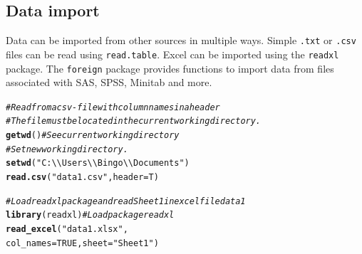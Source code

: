 \documentclass{article}\usepackage[]{graphicx}\usepackage[]{color}
\makeatletter
\newcommand{\hlnum}[1]{\textcolor[rgb]{0.686,0.059,0.569}{#1}}%
\newcommand{\hlstr}[1]{\textcolor[rgb]{0.192,0.494,0.8}{#1}}%
\newcommand{\hlcom}[1]{\textcolor[rgb]{0.678,0.584,0.686}{\textit{#1}}}%
\newcommand{\hlstd}[1]{\textcolor[rgb]{0.345,0.345,0.345}{#1}}%
\newcommand{\hlkwc}[1]{\textcolor[rgb]{0.333,0.667,0.333}{#1}}%
\newcommand{\hlkwd}[1]{\textcolor[rgb]{0.737,0.353,0.396}{\textbf{#1}}}%
\newenvironment{kframe}{%
 \def\at@end@of@kframe{}%
 \ifinner\ifhmode%
  \def\at@end@of@kframe{\end{minipage}}%
  \begin{minipage}{\columnwidth}%
 \fi\fi%
 \def\FrameCommand##1{\hskip\@totalleftmargin \hskip-\fboxsep
 \colorbox{shadecolor}{##1}\hskip-\fboxsep
     \hskip-\linewidth \hskip-\@totalleftmargin \hskip\columnwidth}%
 \MakeFramed {\advance\hsize-\width
   \@totalleftmargin\z@ \linewidth\hsize
   \@setminipage}}%
 {\par\unskip\endMakeFramed%
 \at@end@of@kframe}
\newenvironment{knitrout}{}{} %
\makeatother
\begin{document}
\subsection{Data import}
Data can be imported from other sources in multiple ways. Simple \texttt{.txt} or \texttt{.csv} files can be read using \texttt{read.table}. 
Excel can be imported using the \texttt{readxl} package.
The \texttt{foreign} package provides functions to import data from files associated with SAS, SPSS, Minitab and more.

\begin{knitrout}
\color{fgcolor}\begin{kframe}
\begin{alltt}
\hlcom{#Read from a csv-file with column names in a header}
\hlcom{#The file must be located in the current working directory.}
\hlkwd{getwd}\hlstd{()} \hlcom{#See current working directory}
\hlcom{#Set new working directory.}
\hlkwd{setwd}\hlstd{(}\hlstr{"C:\textbackslash{}\textbackslash{}Users\textbackslash{}\textbackslash{}Bingo\textbackslash{}\textbackslash{}Documents"}\hlstd{)}
\hlkwd{read.csv}\hlstd{(}\hlstr{"data1.csv"}\hlstd{,} \hlkwc{header} \hlstd{= T)}

\hlcom{#Load readxl package and read Sheet 1 in excel file data1}
\hlkwd{library}\hlstd{(readxl)} \hlcom{#Load package readxl}
\hlkwd{read_excel}\hlstd{(}\hlstr{"data1.xlsx"}\hlstd{,}
           \hlkwc{col_names}\hlstd{=} \hlnum{TRUE}\hlstd{,} \hlkwc{sheet} \hlstd{=} \hlstr{"Sheet 1"}\hlstd{)}
\end{alltt}
\end{kframe}
\end{knitrout}
\end{document}

